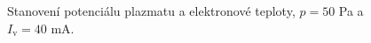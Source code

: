\documentclass[a4paper,12pt]{article}
\begin{document}
\begin{figure}[h]
	\centering
	\begin{subfigure}[b]{.49\textwidth}
		\centering
	\end{subfigure}
	\begin{subfigure}[b]{.49\textwidth}
		\centering
	\end{subfigure}
	\caption{Stanovení potenciálu plazmatu a elektronové teploty, $p = 50$ \si{\pascal} a $I_\text{v} = 40$ \si{\milli\ampere}.}
	\label{data4}
\end{figure}
\end{document}
